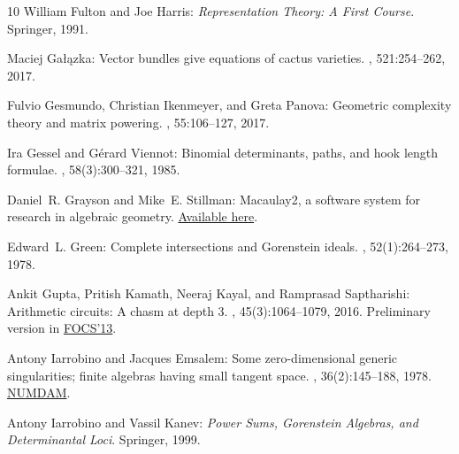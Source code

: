 \documentclass[11pt]{article}
\numberwithin{equation}{section}
\theoremstyle{definition}
\theoremstyle{plain}
\begin{document}
\begin{thebibliography}{10}
{\sc William Fulton and Joe Harris}: {\em {Representation Theory: A First
  Course}}.
\newblock Springer, 1991.
\newblock [\epfmtdoi{10.1007/978-1-4612-0979-9}]

{\sc Maciej Ga{\l}{\k a}zka}: Vector bundles give equations of cactus
  varieties.
, 521:254--262, 2017.

{\sc Fulvio Gesmundo, Christian Ikenmeyer, and Greta Panova}: {Geometric
  complexity theory and matrix powering}.
, 55:106--127, 2017.

{\sc Ira Gessel and G\'erard Viennot}: {Binomial determinants, paths, and hook
  length formulae}.
, 58(3):300--321, 1985.
\newblock [\epfmtdoi{10.1016/0001-8708(85)90121-5}]

{\sc Daniel~R. Grayson and Mike~E. Stillman}: {Macaulay2, a software system for
  research in algebraic geometry}.
\newblock \href{http://www.math.uiuc.edu/Macaulay2/}{Available here}.

{\sc Edward~L. Green}: {Complete intersections and {G}orenstein ideals}.
, 52(1):264--273, 1978.
\newblock [\epfmtdoi{10.1016/0021-8693(78)90274-0}]

{\sc Ankit Gupta, Pritish Kamath, Neeraj Kayal, and Ramprasad Saptharishi}:
  {Arithmetic circuits: A chasm at depth 3}.
, 45(3):1064--1079, 2016.
\newblock Preliminary version in
  \href{https://ieeexplore.ieee.org/document/6686194}{FOCS'13}.
\newblock [\epfmtdoi{10.1137/140957123}]

{\sc Antony Iarrobino and Jacques Emsalem}: Some zero-dimensional generic
  singularities; finite algebras having small tangent space.
, 36(2):145--188, 1978.
\newblock \href{http://www.numdam.org/item/CM_1978__36_2_145_0/}{NUMDAM}.

{\sc Antony Iarrobino and Vassil Kanev}: {\em {Power Sums, {G}orenstein
  Algebras, and Determinantal Loci}}.
\newblock Springer, 1999.


\end{thebibliography}
\end{document}
